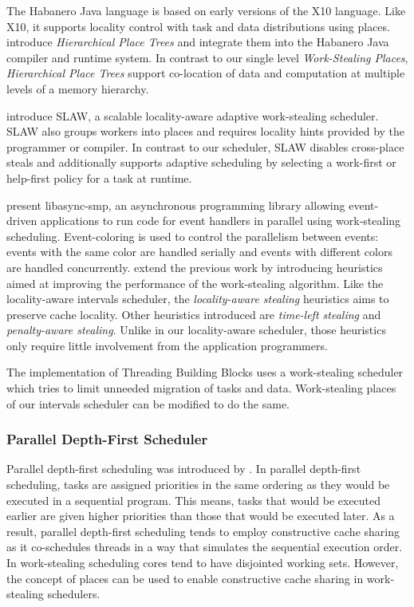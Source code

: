 The Habanero Java \cite{HJ} language is based on early versions of the
X10 language. Like X10, it supports locality control with task and
data distributions using places. \textcite{Yan2009} introduce
\emph{Hierarchical Place Trees} and integrate them into the Habanero
Java compiler and runtime system. In contrast to our single level
\emph{Work-Stealing Places}, \emph{Hierarchical Place Trees} support
co-location of data and computation at multiple levels of a memory
hierarchy.

\textcite{Guo2010} introduce SLAW, a scalable locality-aware adaptive
work-stealing scheduler. SLAW also groups workers into places and
requires locality hints provided by the programmer or compiler. In
contrast to our scheduler, SLAW disables cross-place steals and
additionally supports adaptive scheduling by selecting a work-first or
help-first policy for a task at runtime.

\textcite{Zeldovich2003} present libasync-smp, an asynchronous
programming library allowing event-driven applications to run code for
event handlers in parallel using work-stealing
scheduling. Event-coloring is used to control the parallelism between
events: events with the same color are handled serially and events
with different colors are handled concurrently. \textcite{Gaud2010}
extend the previous work by introducing heuristics aimed at improving
the performance of the work-stealing algorithm. Like the
locality-aware intervals scheduler, the \emph{locality-aware stealing}
heuristics aims to preserve cache locality. Other heuristics
introduced are \emph{time-left stealing} and \emph{penalty-aware
  stealing}. Unlike in our locality-aware scheduler, those heuristics
only require little involvement from the application programmers.

The implementation of Threading Building Blocks \cite{Contreras2008,
  Reinders2007} uses a work-stealing scheduler which tries to limit
unneeded migration of tasks and data. Work-stealing places of our
intervals scheduler can be modified to do the same.

\subsubsection{Parallel Depth-First Scheduler}

Parallel depth-first scheduling was introduced by
\textcite{Blelloch1999}. In parallel depth-first scheduling, tasks are
assigned priorities in the same ordering as they would be executed in
a sequential program. This means, tasks that would be executed earlier
are given higher priorities than those that would be executed
later. As a result, parallel depth-first scheduling tends to employ
constructive cache sharing \cite{Liaskovitis2006, Chen2007} as it
co-schedules threads in a way that simulates the sequential execution
order. In work-stealing scheduling cores tend to have disjointed
working sets. However, the concept of places can be used to enable
constructive cache sharing in work-stealing schedulers.


